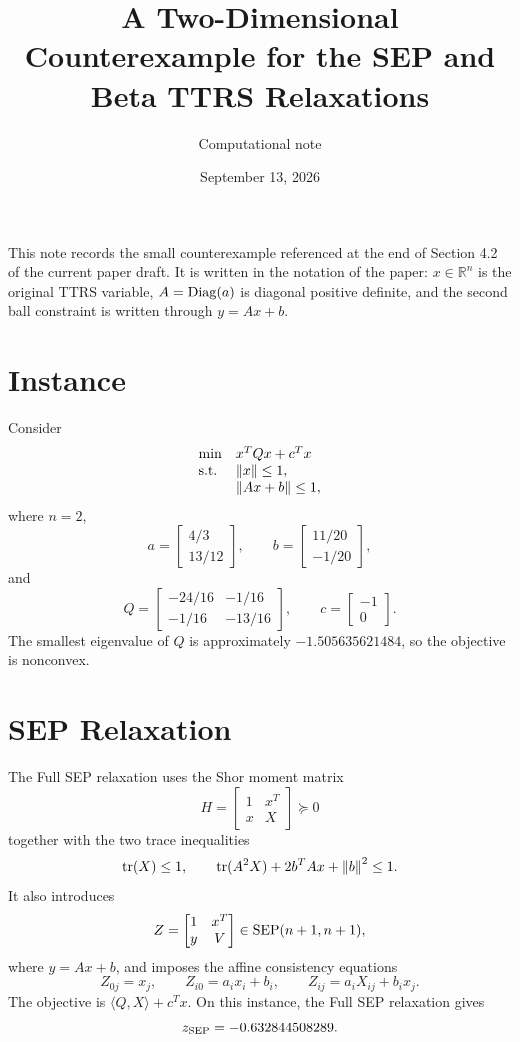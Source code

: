 \documentclass[11pt]{article}
\title{A Two-Dimensional Counterexample for the SEP and Beta TTRS Relaxations}
\author{Computational note}
\date{September 13, 2026}
\newcommand{\Rbb}{\mathbb{R}}
\newcommand{\Diag}{{\rm Diag}}
\newcommand{\SEP}{{\rm SEP}}
\newcommand{\tran}{^T}
\newcommand{\norm}[1]{\left\lVert #1\right\rVert}
\newcommand{\mprod}[2]{\langle #1,#2\rangle}
\begin{document}
\maketitle

\noindent
This note records the small counterexample referenced at the end of Section 4.2
of the current paper draft.  It is written in the notation of the paper:
\(x\in\Rbb^n\) is the original TTRS variable, \(A=\Diag(a)\) is diagonal
positive definite, and the second ball constraint is written through
\(y=Ax+b\).

\section{Instance}

Consider
\begin{equation}
    \begin{array}{ll}
    \min & x\tran Qx+c\tran x\\
    {\rm s.t.} & \norm{x}\leq 1,\\
                & \norm{Ax+b}\leq 1,
    \end{array}
    \label{eq:ttrs-counterexample}
\end{equation}
where \(n=2\),
\[
    a=
    \begin{bmatrix}
    4/3\\[2pt]
    13/12
    \end{bmatrix},
    \qquad
    b=
    \begin{bmatrix}
    11/20\\[2pt]
    -1/20
    \end{bmatrix},
\]
and
\[
Q=
\begin{bmatrix}
-24/16 & -1/16\\[2pt]
-1/16 & -13/16
\end{bmatrix},
\qquad
c=
\begin{bmatrix}
-1\\[2pt]
0
\end{bmatrix}.
\]
The smallest eigenvalue of \(Q\) is approximately \(-1.505635621484\), so the
objective is nonconvex.

\section{SEP Relaxation}

The Full SEP relaxation uses the Shor moment matrix
\[
    H=
    \begin{bmatrix}
    1 & x\tran\\
    x & X
    \end{bmatrix}\succeq0
\]
together with the two trace inequalities
\[
    {\rm tr}(X)\leq1,\qquad
    {\rm tr}(A^2X)+2b\tran Ax+\norm{b}^2\leq1.
\]
It also introduces
\[
    Z=
    \begin{bmatrix}
    1 & x\tran\\
    y & V
    \end{bmatrix}
    \in\SEP(n+1,n+1),
\]
where \(y=Ax+b\), and imposes the affine consistency equations
\[
    Z_{0j}=x_j,\qquad
    Z_{i0}=a_ix_i+b_i,\qquad
    Z_{ij}=a_iX_{ij}+b_ix_j.
\]
The objective is \(\mprod{Q}{X}+c\tran x\).  On this instance, the Full SEP
relaxation gives
\[
    z_{\rm SEP}=-0.632844508289.
\]
\end{document}
